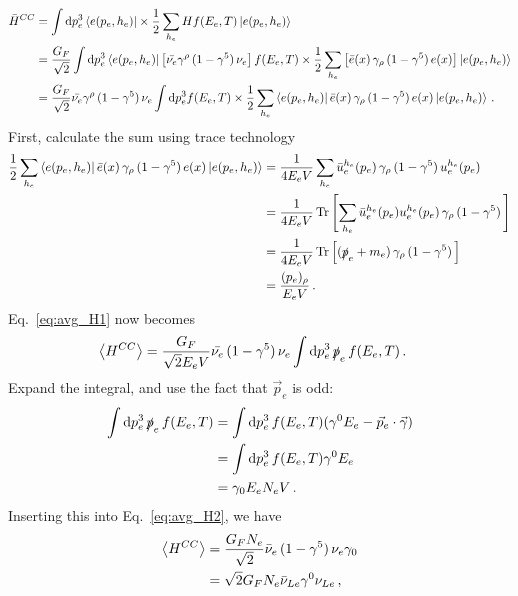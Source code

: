 \begin{align}\label{eq:avg_H1}
    \bar{H}^{CC} &= \int \dd p_e^3 \bra{e(p_e,h_e)} \times \frac{1}{2} \sum_{h_e} H   f(E_e,T) \ket{e(p_e,h_e)} \nonumber \\
           &= \frac{G_F}{\sqrt{2}} \int \dd p_e^3 \bra{e(p_e,h_e)} \left[ \bar{\nu_e} \gamma^\rho\, (1- \gamma^5)\, \nu_e \right]  f(E_e,T) \times \frac{1}{2} \sum_{h_e} \left[\bar e(x) \,\gamma_\rho\, (1- \gamma^5)\, e(x) \right] \ket{e(p_e,h_e)} \nonumber \\
           &= \frac{G_F}{\sqrt{2}} \bar{\nu_e} \gamma^\rho\, (1- \gamma^5)\, \nu_e \int \dd p_e^3  f(E_e,T) \times \frac{1}{2} \sum_{h_e} \bra{e(p_e,h_e)} \bar e(x) \,\gamma_\rho\, (1- \gamma^5)\, e(x)   \ket{e(p_e,h_e)}\,.
\end{align}
First, calculate the sum using trace technology %
\begin{align}\label{eq:helicity_sum}
    \frac{1}{2} \sum_{h_e} \bra{e(p_e,h_e)} \bar e(x) \,\gamma_\rho\, (1- \gamma^5)\, e(x)   \ket{e(p_e,h_e)} &= \frac{1}{4E_e V} \sum_{h_e} \bar{u}_e^{h_e}(p_e) \,\gamma_\rho\, (1- \gamma^5)\, u_e^{h_e}(p_e) \nonumber \\
    &= \frac{1}{4 E_e V} \Trace{\left[ \sum_{h_e} \bar{u}_e^{h_e}(p_e) u_e^{h_e}(p_e) \,\gamma_\rho\, (1- \gamma^5)\, \right]} \nonumber \\
    &= \frac{1}{4 E_e V} \Trace{\left[ (\slashed{p}_e + m_e ) \,\gamma_\rho\, (1- \gamma^5)\, \right]} \nonumber \\
    &= \frac{(p_e)_\rho}{E_e V}\,.
\end{align}
Eq.~\ref{eq:avg_H1} now becomes 
\begin{align}\label{eq:avg_H2}
    \left\langle {H^{CC}} \right \rangle &= \frac{G_F}{\sqrt{2}E_e V} \bar{\nu_e} \, (1- \gamma^5)\, \nu_e \int \dd p_e^3\, \slashed{p}_e\, f(E_e,T)\,.
\end{align}
Expand the integral, and use the fact that $\vec{p}_e$ is odd:
\begin{align}
    \int \dd p_e^3\, \slashed{p}_e\, f(E_e,T) &= \int \dd p_e^3\, f(E_e,T) (\gamma^0 E_e - \vec{p}_e \cdot \vec{\gamma}) \nonumber \\
                                              &= \int \dd p_e^3\, f(E_e,T) \gamma^0 E_e \nonumber \\
                                              &= \gamma_0 E_e N_e V\,.
\end{align}
Inserting this into Eq.~\ref{eq:avg_H2}, we have
\begin{align}
    \left\langle {H^{CC}} \right \rangle &= \frac{G_F N_e}{\sqrt{2}} \bar{\nu}_e \, (1- \gamma^5)\, \nu_e \gamma_0 \nonumber \\
            &= \sqrt{2}G_F N_e \bar{\nu}_{Le} \gamma^0 \nu_{Le}\,,
\end{align}

